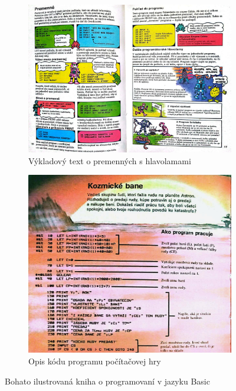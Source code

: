 \begin{figure}[h]
\centering
\begin{subfigure}[b]{0.55\textwidth}
\centering
\includegraphics[width=\textwidth]{assets/kniha-premenne.jpg}
\caption{Výkladový text o premenných s hlavolamami}
\label{fig:skusis-prog-premenne}
\end{subfigure}
\hfill
\begin{subfigure}[b]{0.44\textwidth}
\centering
\includegraphics[width=\textwidth]{assets/program-kozmicke-bane.jpg}
\caption{Opis kódu programu počítačovej hry}
\label{fig:skusis-prog-kozmicke-bane}
\end{subfigure}
\caption{Bohato ilustrovaná kniha o programovaní v jazyku Basic}
\end{figure}

